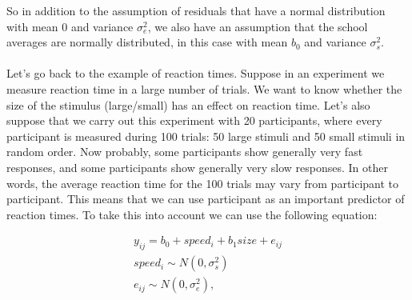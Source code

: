 \documentclass[]{book}\usepackage[]{graphicx}\usepackage[]{color}
\begin{document}
So in addition to the assumption of residuals that have a normal distribution with mean 0 and variance $\sigma_e^2$, we also have an assumption that the school averages are normally distributed, in this case with mean $b_0$ and variance $\sigma_s^2$.
\\
\\
Let's go back to the example of reaction times. Suppose in an experiment we measure reaction time in a large number of trials. We want to know whether the size of the stimulus (large/small) has an effect on reaction time. Let's also suppose that we carry out this experiment with 20 participants, where every participant is measured during 100 trials: 50 large stimuli and 50 small stimuli in random order. Now probably, some participants show generally very fast responses, and some participants show generally very slow responses. In other words, the average reaction time for the 100 trials may vary from participant to participant. This means that we can use participant as an important predictor of reaction times. To take this into account we can use the following equation:


\begin{eqnarray}
y_{ij} = b_0 + speed_i + b_1 size + e_{ij} \\
speed_i \sim N(0, \sigma_s^2)\\
e_{ij} \sim N(0, \sigma_e^2),
\end{eqnarray}
\end{document}
